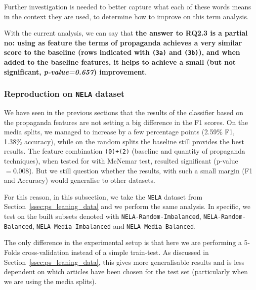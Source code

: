 Further investigation is needed to better capture what each of these words means in the context they are used, to determine how to improve on this term analysis.%

With the current analysis, we can say that \textbf{the answer to RQ2.3 is a partial no: using as feature the terms of propaganda achieves a very similar score to the baseline (rows indicated with \texttt{(3a)} and \texttt{(3b)}), and when added to the baseline features, it helps to achieve a small (but not significant, \textit{p-value=0.657}) improvement}. %


\subsubsection{\statusgreen Reproduction on \texttt{NELA} dataset}




We have seen in the previous sections that the results of the classifier based on the propaganda features are not setting a big difference in the F1 scores. On the media splits, we managed to increase by a few percentage points (2.59\% F1, 1.38\% accuracy), while on the random splits the baseline still provides the best results.
The feature combination \texttt{(0)+(2)} (baseline and quantity of propaganda techniques), when tested for with McNemar test, resulted significant (p-value $=0.008$).
But we still question whether the results, with such a small margin (F1 and Accuracy) would generalise to other datasets.

For this reason, in this subsection, we take the \texttt{NELA} dataset from Section~\ref{ssec:ps_leaning_data} and we perform the same analysis. In specific, we test on the built subsets denoted with \texttt{NELA-Random-Imbalanced}, \texttt{NELA-Random-Balanced}, \texttt{NELA-Media-Imbalanced} and \texttt{NELA-Media-Balanced}.


The only difference in the experimental setup is that here we are performing a 5-Folds cross-validation instead of a simple train-test.
As discussed in Section~\ref{ssec:ps_leaning_data}, this gives more generalisable results and is less dependent on which articles have been chosen for the test set (particularly when we are using the media splits).

